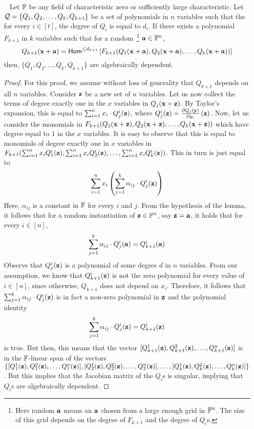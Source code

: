 \begin{lemma}~\label{lem:using algebraic dependence-converse}
Let $\mathbb{F}$ be any  field of characteristic zero or sufficiently large characteristic. Let ${\cal Q} = \{Q_1, Q_2, \ldots, Q_k, Q_{k+1}\}$ be a set of polynomials in $n$ variables such that the for every $i \in [t]$, the degree of  $Q_i$ is equal to $d_i$. 
If there exists a polynomial $F_{k+1}$  in $k$ variables such that for a random~\footnote{Here random $\mathbf{a}$ means an $\mathbf{a}$ chosen from a large enough grid in $\mathbb{F}^n$. The size of this grid depends on the degree of $F_{k+1}$ and the degree of $Q_i$s. } $\mathbf{a} \in \mathbb{F}^{n}$,  
$$Q_{k+1}(\mathbf{x} + \mathbf{a}) = \mathsf{Hom}^{\leq d_{k+1}}\left[F_{k+1}(Q_1(\mathbf{x} + \mathbf{a}), Q_2(\mathbf{x} + \mathbf{a}), \ldots, Q_k(\mathbf{x} + \mathbf{a})) \right] $$
then, $\{Q_1, Q_2, \ldots, Q_k, Q_{k+1}\}$ are algebraically dependent. 
\end{lemma}
\begin{proof}
For this proof, we assume without loss of generality that $Q_{k+1}$ depends on all $n$ variables. Consider $\mathbf{z}$ be a new set of $n$ variables. Let us now collect the terms of degree exactly one in the $x$ variables in $Q_{j}(\mathbf{x} + \mathbf{z})$. By Taylor's expansion, this is equal to $\sum_{i = 1}^n x_i\cdot Q^i_j(\mathbf{z})$, where $ Q^i_j(\mathbf{z}) = \frac{\partial Q_{j}(\mathbf{y})}{\partial y_i}\left(\mathbf{z} \right)$. 
Now, let us consider the monomials  in  $F_{k+1}(Q_1(\mathbf{x} + \mathbf{z}), Q_2(\mathbf{x} + \mathbf{z}), \ldots, Q_k(\mathbf{x} + \mathbf{z}))$ which have degree equal to $1$ in the $x$ variables. It is easy to observe that this is equal to monomials of degree exactly one in $x$ variables in  $F_{k+1}(\sum_{i = 1}^n x_iQ^i_1(\mathbf{z}), \sum_{i = 1}^n x_iQ^i_2(\mathbf{z}), \ldots, \sum_{i = 1}^n x_iQ^i_k(\mathbf{z}))$. This in turn is just equal to 
\[
\sum_{i = 1}^n x_i\left( \sum_{j = 1}^k \alpha_{ij}\cdot Q^i_j(\mathbf{z}) \right)
\]
Here, $\alpha_{ij}$ is a constant in $\mathbb{F}$ for every $i$ and $j$. From the hypothesis of the lemma, it follows that for a random instantiation of $\mathbf{z} \in \mathbb{F}^n$, say $\mathbf{z} = \mathbf{a}$, it holds that for every $i\in [n]$,
\[
\sum_{j = 1}^k \alpha_{ij}\cdot Q^i_j(\mathbf{a}) = Q^i_{k+1}(\mathbf{a})
\]
Observe that $Q^{i}_j(\mathbf{z})$ is a polynomial of some degree $d$ in $n$ variables. From our assumption, we know that $Q^{i}_{k+1}(\mathbf{z})$ is not the zero polynomial for every value of $i \in [n]$, since otherwise, $Q_{k+1}$ does not depend on $x_i$. Therefore, it follows that $\sum_{j = 1}^k \alpha_{ij}\cdot Q^i_j(\mathbf{z})$ is in fact a non-zero polynomial in $\mathbf{z}$ and the polynomial identity 
\[
\sum_{j = 1}^k \alpha_{ij}\cdot Q^i_j(\mathbf{z}) = Q^i_{k+1}(\mathbf{z})
\]
is true. But then, this means that the vector $[Q^1_{k+1}(\mathbf{z}), Q^2_{k+1}(\mathbf{z}), \ldots, Q^n_{k+1}(\mathbf{z})]$ is in the $\mathbb{F}$-linear span of the vectors $\{[Q^1_{1}(\mathbf{z}), Q^2_{1}(\mathbf{z}), \ldots, Q^n_{1}(\mathbf{z})], [Q^1_{2}(\mathbf{z}), Q^2_{2}(\mathbf{z}), \ldots, Q^n_{2}(\mathbf{z})], \ldots, [Q^1_{k}(\mathbf{z}), Q^2_{k}(\mathbf{z}), \ldots, Q^n_{k}(\mathbf{z})]\}$. But this implies that the Jacobian matrix of the $Q_i$s is singular, implying that $Q_i$s are algebraically dependent. 

\end{proof}


